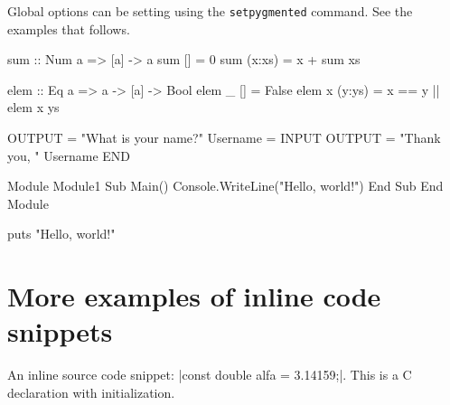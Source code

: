 \documentclass[10pt,a4paper]{article}
\begin{document}
Global options can be setting using the \verb|setpygmented| command.
See the examples that follows.

\begin{Example}

\begin{pygmented}[]
sum :: Num a => [a] -> a
sum [] = 0
sum (x:xs) = x + sum xs
\end{pygmented}
\end{Example}

\begin{Example}
\begin{pygmented}[colback=blue!20, boxing method=tcolorbox]
elem :: Eq a => a -> [a] -> Bool
elem _ [] = False
elem x (y:ys) = x == y || elem x ys
\end{pygmented}
\end{Example}

\begin{Example}

\begin{pygmented}[]
          OUTPUT = "What is your name?"
          Username = INPUT
          OUTPUT = "Thank you, " Username
END
\end{pygmented}
\end{Example}

\begin{Example}

\begin{pygmented}[test, lang=vbnet]
Module Module1
    Sub Main()
        Console.WriteLine("Hello, world!")
    End Sub
End Module
\end{pygmented}
\end{Example}

\begin{Example}
\begin{pygmented}[lang=tcl]
puts "Hello, world!"
\end{pygmented}
\end{Example}

\section{More examples of inline code snippets}

\begin{Example}
  An inline source code snippet:
  \pyginline[lang=c]|const double alfa = 3.14159;|.
  This is a C declaration with initialization.
\end{Example}
\end{document}
